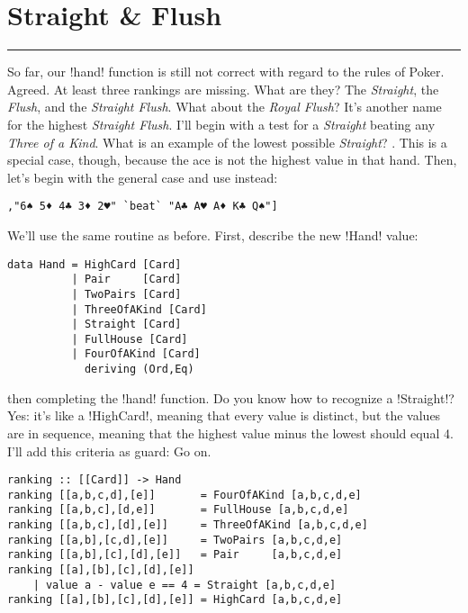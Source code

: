 \newpage
\section{Straight \& Flush} 
\vspace{10cm}
\hrule

\lhQ So far, our \il!hand! function is still not correct with regard to the rules of Poker.
\lhA Agreed. At least three rankings are missing.
\lhN What are they?
\lhA The \emph{Straight}, the \emph{Flush}, and the \emph{Straight Flush}.
\lhN What about the \emph{Royal Flush}?
\lhA It's another name for the highest \emph{Straight Flush}.
\lhN I'll begin with a test for a \emph{Straight} beating any \emph{Three of a Kind}. What is an example of the lowest possible \emph{Straight}?
\lhA {}    . This is a special case, though, because the ace is not the highest value in that hand.
\lhN Then, let's begin with the general case and use      instead:
\begin{lstlisting}[frame=single]
        ,"6♠ 5♦ 4♣ 3♦ 2♥" `beat` "A♣ A♥ A♦ K♣ Q♠"]
\end{lstlisting}
\hspace*{\fill}
\lhA \failure We'll use the same routine as before. First, describe the new \il!Hand! value:
\begin{lstlisting}[frame=single]
data Hand = HighCard [Card]
          | Pair     [Card]
          | TwoPairs [Card]
          | ThreeOfAKind [Card]
          | Straight [Card]
          | FullHouse [Card]
          | FourOfAKind [Card]
            deriving (Ord,Eq)
\end{lstlisting}
\failure then completing the \il!hand! function.
\lhN Do you know how to recognize a \il!Straight!?
\lhA \failure Yes: it's like a \il!HighCard!, meaning that every value is distinct, but the values are in sequence, meaning that the highest value minus the lowest should equal 4. I'll add this criteria as guard:
\lhN Go on.
\lhA
\begin{lstlisting}[frame=single]
ranking :: [[Card]] -> Hand
ranking [[a,b,c,d],[e]]       = FourOfAKind [a,b,c,d,e]
ranking [[a,b,c],[d,e]]       = FullHouse [a,b,c,d,e]
ranking [[a,b,c],[d],[e]]     = ThreeOfAKind [a,b,c,d,e]
ranking [[a,b],[c,d],[e]]     = TwoPairs [a,b,c,d,e]
ranking [[a,b],[c],[d],[e]]   = Pair     [a,b,c,d,e]
ranking [[a],[b],[c],[d],[e]] 
    | value a - value e == 4 = Straight [a,b,c,d,e] 
ranking [[a],[b],[c],[d],[e]] = HighCard [a,b,c,d,e] 
\end{lstlisting}
